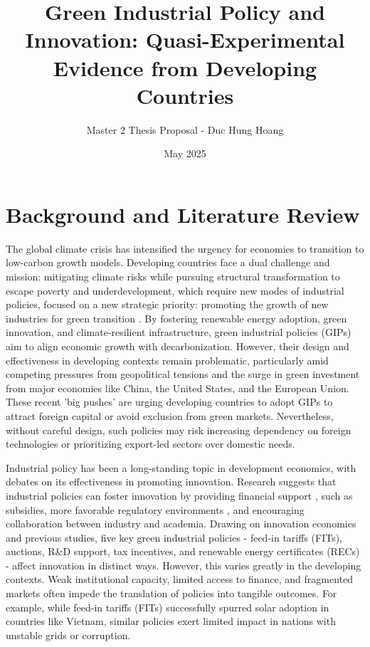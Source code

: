 \documentclass[12pt]{article}
\title{Green Industrial Policy and Innovation: Quasi-Experimental Evidence from Developing Countries}
\author{Master 2 Thesis Proposal - Duc Hung Hoang}
\date{May 2025}
\begin{document}
\maketitle

\section{Background and Literature Review}

The global climate crisis has intensified the urgency for economies to transition to low-carbon growth models. 
Developing countries face a dual challenge and mission: mitigating climate risks while pursuing structural transformation to escape poverty and underdevelopment, which require new modes of industrial policies, focused on a new strategic priority: promoting the growth of new industries for green transition \parencite{rodrik2024}. By fostering renewable energy adoption, green innovation, and climate-resilient infrastructure, green industrial policies (GIPs) aim to align economic growth with decarbonization. However, their design and effectiveness in developing contexts remain problematic, particularly amid competing pressures from geopolitical tensions and the surge in green investment from major economies like China, the United States, and the European Union. These recent 'big pushes' are urging developing countries to adopt GIPs to attract foreign capital or avoid exclusion from green markets. Nevertheless, without careful design, such policies may risk increasing dependency on foreign technologies or prioritizing export-led sectors over domestic needs. 

Industrial policy has been a long-standing topic in development economics, with debates on its effectiveness in promoting innovation. Research suggests that industrial policies can foster innovation by providing financial support \parencite{Aghion2015}, such as subsidies, more favorable regulatory environments \parencite{rodrik2004}, and encouraging collaboration between industry and academia. Drawing on innovation economics and previous studies, five key green industrial policies - feed-in tariffs (FITs), auctions, R\&D support, tax incentives, and renewable energy certificates (RECs) - affect innovation in distinct ways. 
However, this varies greatly in the developing contexts. Weak institutional capacity, limited access to finance, and fragmented markets often impede the translation of policies into tangible outcomes. For example, while feed-in tariffs (FITs) successfully spurred solar adoption in countries like Vietnam, similar policies exert limited impact in nations with unstable grids or corruption. 
\end{document}
